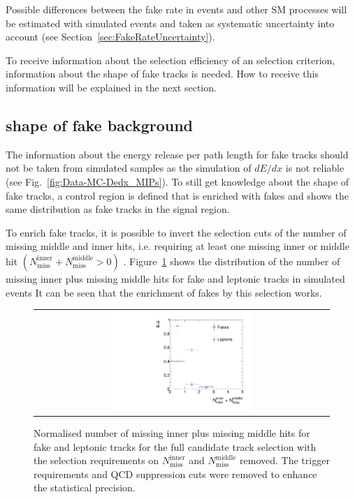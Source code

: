 Possible differences between the fake rate in \Zlep events and other SM processes will be estimated with simulated events and taken as systematic uncertainty into account (see Section~\ref{sec:FakeRateUncertainty}).

To receive information about the selection efficiency of an \ias selection criterion, information about the \ias shape of fake tracks is needed.
How to receive this information will be explained in the next section.

\subsection*{\ias shape of fake background}
The information about the energy release per path length for fake tracks should not be taken from simulated samples as the simulation of $dE/dx$ is not reliable (see Fig.~\ref{fig:Data-MC-Dedx_MIPs}).
To still get knowledge about the \ias shape of fake tracks, a control region \fakeCR is defined that is enriched with fakes and shows the same \ias distribution as fake tracks in the signal region.

To enrich fake tracks, it is possible to invert the selection cuts of the number of missing middle and inner hits, i.e. requiring at least one missing inner or middle hit $\left( N_{\text{miss}}^{\text{inner}} +N_{\text{miss}}^{\text{middle}}>0\right)$ .
Figure~\ref{fig:NMissInnerAndMiddle} shows the distribution of the number of missing inner plus missing middle hits for fake and leptonic tracks in simulated \WJets events
It can be seen that the enrichment of fakes by this selection works. 
\begin{figure}[!b]
  \centering 
  \begin{tabular}{c}
    \includegraphics[width=0.49\textwidth]{figures/analysis/Background/NLostInnerPlusMiddleForAllBkg_chiTracksQCDsupressionTrigger.pdf}
  \end{tabular}
  \caption{Normalised number of missing inner plus missing middle hits for fake and leptonic tracks for the full candidate track selection with the selection requirements on $N_{\text{miss}}^{\text{inner}}$ and $N_{\text{miss}}^{\text{middle}}$ removed. The trigger requirements and QCD suppression cuts were removed to enhance the statistical precision.}
  \label{fig:NMissInnerAndMiddle}
\end{figure}

